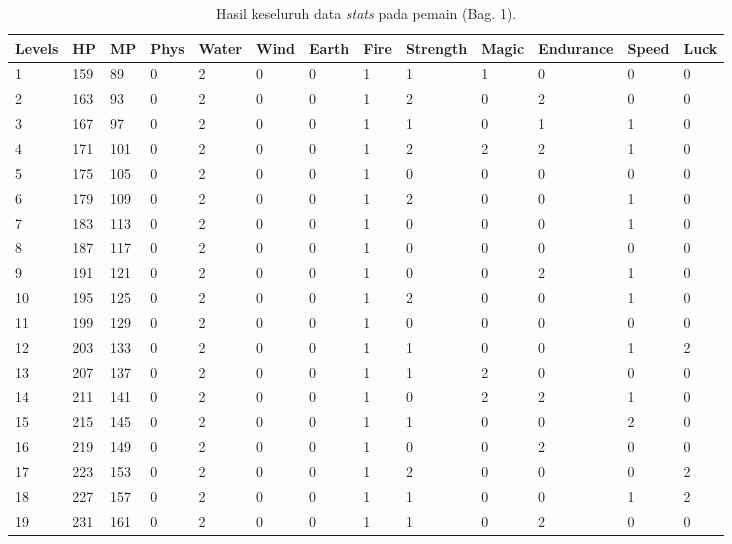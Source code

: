 \begin{sidewaystable}[!h]
	\centering
	\caption{Hasil keseluruh data \textit{stats} pada pemain (Bag. 1).}
	\label{tb:player_all_stats_1}
	\vspace{1ex}
	\begin{tabular}{|l|l|l|l|l|l|l|l|l|l|l|l|l|}
		\hline
		\rowcolor[HTML]{C0C0C0} 
		\textbf{Levels} & \textbf{HP} & \textbf{MP} & \textbf{Phys} & \textbf{Water} & \textbf{Wind} & \textbf{Earth} & \textbf{Fire} & \textbf{Strength} & \textbf{Magic} & \textbf{Endurance} & \textbf{Speed} & \textbf{Luck} \\ \hline
		1 & 159 & 89 & 0 & 2 & 0 & 0 & 1 & 1 & 1 & 0 & 0 & 0 \\ \hline
		2 & 163 & 93 & 0 & 2 & 0 & 0 & 1 & 2 & 0 & 2 & 0 & 0 \\ \hline
		3 & 167 & 97 & 0 & 2 & 0 & 0 & 1 & 1 & 0 & 1 & 1 & 0 \\ \hline
		4 & 171 & 101 & 0 & 2 & 0 & 0 & 1 & 2 & 2 & 2 & 1 & 0 \\ \hline
		5 & 175 & 105 & 0 & 2 & 0 & 0 & 1 & 0 & 0 & 0 & 0 & 0 \\ \hline
		6 & 179 & 109 & 0 & 2 & 0 & 0 & 1 & 2 & 0 & 0 & 1 & 0 \\ \hline
		7 & 183 & 113 & 0 & 2 & 0 & 0 & 1 & 0 & 0 & 0 & 1 & 0 \\ \hline
		8 & 187 & 117 & 0 & 2 & 0 & 0 & 1 & 0 & 0 & 0 & 0 & 0 \\ \hline
		9 & 191 & 121 & 0 & 2 & 0 & 0 & 1 & 0 & 0 & 2 & 1 & 0 \\ \hline
		10 & 195 & 125 & 0 & 2 & 0 & 0 & 1 & 2 & 0 & 0 & 1 & 0 \\ \hline
		11 & 199 & 129 & 0 & 2 & 0 & 0 & 1 & 0 & 0 & 0 & 0 & 0 \\ \hline
		12 & 203 & 133 & 0 & 2 & 0 & 0 & 1 & 1 & 0 & 0 & 1 & 2 \\ \hline
		13 & 207 & 137 & 0 & 2 & 0 & 0 & 1 & 1 & 2 & 0 & 0 & 0 \\ \hline
		14 & 211 & 141 & 0 & 2 & 0 & 0 & 1 & 0 & 2 & 2 & 1 & 0 \\ \hline
		15 & 215 & 145 & 0 & 2 & 0 & 0 & 1 & 1 & 0 & 0 & 2 & 0 \\ \hline
		16 & 219 & 149 & 0 & 2 & 0 & 0 & 1 & 0 & 0 & 2 & 0 & 0 \\ \hline
		17 & 223 & 153 & 0 & 2 & 0 & 0 & 1 & 2 & 0 & 0 & 0 & 2 \\ \hline
		18 & 227 & 157 & 0 & 2 & 0 & 0 & 1 & 1 & 0 & 0 & 1 & 2 \\ \hline
		19 & 231 & 161 & 0 & 2 & 0 & 0 & 1 & 1 & 0 & 2 & 0 & 0 \\ \hline

\end{tabular}
\end{sidewaystable}
